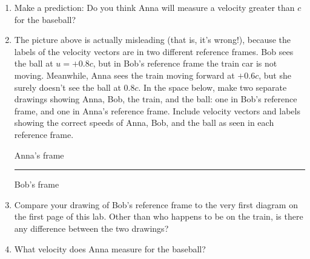 \begin{enumerate}[labparts]
\item Make a prediction: Do you think Anna will measure a velocity greater than $c$ for the baseball?
\answerspace{0.5in}

\item The picture above is actually misleading (that is, it's wrong!), because the labels of the velocity vectors are in two different reference frames.  Bob sees the ball at $u=+0.8c$, but in Bob's reference frame the train car is not moving.  Meanwhile, Anna sees the train moving forward at $+0.6c$, but she surely doesn't see the ball at $0.8c$.  In the space below, make two separate drawings showing Anna, Bob, the train, and the ball: one in Bob's reference frame, and one in Anna's reference frame.  Include velocity vectors and labels showing the correct speeds of Anna, Bob, and the ball as seen in each reference frame.  

\hspace{\fill}Anna's frame\hspace{\fill}\rule{1pt}{3in}\hspace{\fill}Bob's frame\hspace{\fill}

\item Compare your drawing of Bob's reference frame to the very first diagram on the first page of this lab.  Other than who happens to be on the train, is there any difference between the two drawings?
\answerspace{0.5in}

\item What velocity does Anna measure for the baseball?
\answerspace{0.5in}

\end{enumerate}


